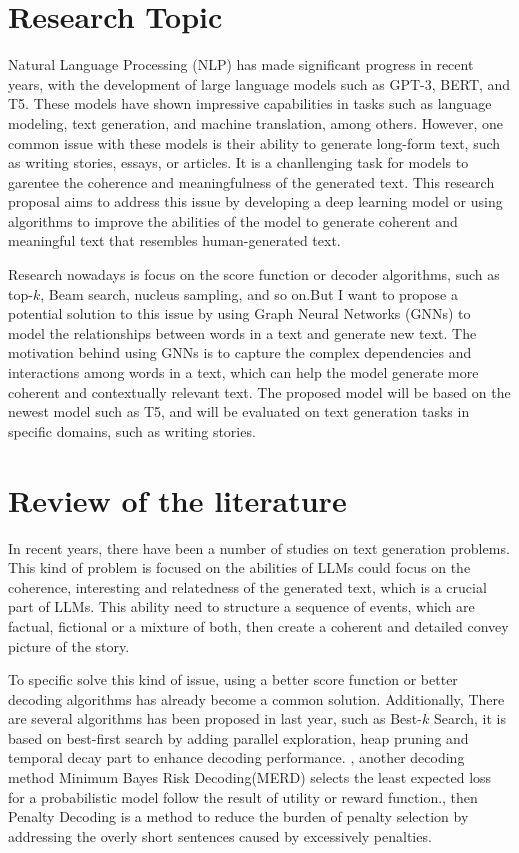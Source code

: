 \documentclass[10pt]{article}
\begin{document}
\begin{multicols}{2}
\section{Research Topic}
Natural Language Processing (NLP) has made significant progress in recent years, with the development of large language models such as GPT-3, BERT, and T5. These models have shown impressive capabilities in tasks such as language modeling, text generation, and machine translation, among others. However, one common issue with these models is their ability to generate long-form text, such as writing stories, essays, or articles. It is a chanllenging task for models to garentee the coherence and meaningfulness of the generated text. This research proposal aims to address this issue by developing a deep learning model or using algorithms to improve the abilities of the model to generate coherent and meaningful text that resembles human-generated text.

Research nowadays is focus on the score function or decoder algorithms, such as top-$k$, Beam search, nucleus sampling, and so on.But I want to propose a potential solution to this issue by using Graph Neural Networks (GNNs) to model the relationships between words in a text and generate new text. The motivation behind using GNNs is to capture the complex dependencies and interactions among words in a text, which can help the model generate more coherent and contextually relevant text. The proposed model will be based on the newest model such as T5, and will be evaluated on text generation tasks in specific domains, such as writing stories.


\section{Review of the literature}

In recent years, there have been a number of studies on text generation problems. This kind of problem is focused on the abilities of LLMs could focus on the coherence, interesting and relatedness of the generated text, which is a crucial part of LLMs. This ability need to structure a sequence of events, which are factual, fictional or a mixture of both, then create a coherent and detailed convey picture of the story\cite{du-chilton-2023-storywars}. 

To specific solve this kind of issue, using a better score function or better decoding algorithms has already become a common solution\cite{amini-etal-2023-generating}.
Additionally, There are several algorithms has been proposed in last year, such as Best-$k$ Search, it is based on best-first search by adding parallel exploration, heap pruning and temporal decay part to enhance decoding performance. \cite{xu-etal-2023-best}, another decoding method Minimum Bayes Risk Decoding(MERD) selects the least expected loss for a probabilistic model follow the result of utility or reward function.\cite{suzgun-etal-2023-follow}, then Penalty Decoding is a method to reduce the burden of penalty selection by addressing the overly short sentences caused by excessively penalties\cite{zhu-etal-2023-penalty}.


\end{multicols}
\end{document}
